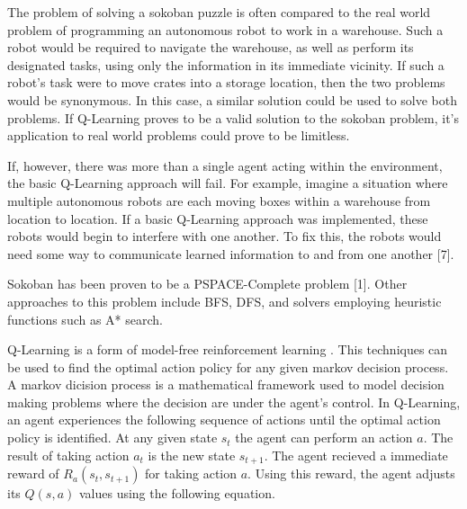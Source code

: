 \documentclass[times, 10pt,twocolumn]{article}
\begin{document}

The problem of solving a sokoban puzzle is often compared to the real world problem of programming an autonomous robot to work in a warehouse. Such a robot would be required to navigate the warehouse, as well as perform its designated tasks, using only the information in its immediate vicinity. If such a robot’s task were to move crates into a storage location, then the two problems would be synonymous. In this case, a similar solution could be used to solve both problems. If Q-Learning proves to be a valid solution to the sokoban problem, it’s application to real world problems could prove to be limitless.

If, however, there was more than a single agent acting within the environment, the basic Q-Learning approach will fail. For example, imagine a situation where multiple autonomous robots are each moving boxes within a warehouse from location to location. If a basic Q-Learning approach was implemented, these robots would begin to interfere with one another. To fix this, the robots would need some way to communicate learned information to and from one another [7].



Sokoban has been proven to be a PSPACE-Complete problem [1]. Other approaches to this problem include BFS, DFS, and solvers employing heuristic functions such as A* search.


Q-Learning is a form of model-free reinforcement learning \cite{Watkins1992}. This techniques can be used to find the optimal action policy for any given markov decision process. A markov dicision process is a mathematical framework used to model decision making problems where the decision are under the agent's control. In Q-Learning, an agent experiences the following sequence of actions until the optimal action policy is identified. At any given state $s_t$ the agent can perform an action $a$. The result of taking action $a_t$ is the new state $s_{t+1}$. The agent recieved a immediate reward of $R_a(s_t, s_{t+1})$ for taking action $a$. Using this reward, the agent adjusts its $Q(s, a)$ values using the following equation. \cite{Watkins1992}
\end{document}
